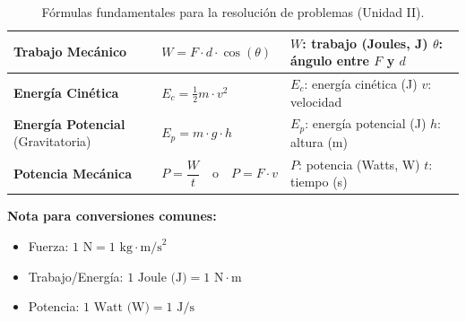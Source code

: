\documentclass[12pt,letterpaper]{article}
\begin{document}
\begin{table}[h!]
\begin{tabular}{|>{\raggedright\arraybackslash}p{4cm}|>{\centering\arraybackslash}p{5.5cm}|>{\raggedright\arraybackslash}p{5cm}|}
        \hline
        \textbf{Trabajo Mecánico} & $W = F \cdot d \cdot \cos(\theta)$ & $W$: trabajo (Joules, J) \newline $\theta$: ángulo entre $F$ y $d$ \\
        \hline
        \textbf{Energía Cinética} & $E_c = \frac{1}{2} m \cdot v^2$ & $E_c$: energía cinética (J) \newline $v$: velocidad \\
        \hline
        \textbf{Energía Potencial} \newline (Gravitatoria) & $E_p = m \cdot g \cdot h$ & $E_p$: energía potencial (J) \newline $h$: altura (m) \\
        \hline
        \textbf{Potencia Mecánica} & $P = \dfrac{W}{t} \quad \text{o} \quad P = F \cdot v$ & $P$: potencia (Watts, W) \newline $t$: tiempo (s) \\
        \hline
    \end{tabular}
    \vspace{0.3cm}
    \caption{Fórmulas fundamentales para la resolución de problemas (Unidad II).}
    \label{tab:formulas_u2}
\end{table}

\vspace{0.5cm}
\noindent \textbf{Nota para conversiones comunes:}
\begin{itemize}
    \item Fuerza: $1 \text{ N} = 1 \text{ kg} \cdot \text{m/s}^2$
    \item Trabajo/Energía: $1 \text{ Joule (J)} = 1 \text{ N} \cdot \text{m}$
    \item Potencia: $1 \text{ Watt (W)} = 1 \text{ J/s}$
\end{itemize}
\end{document}

